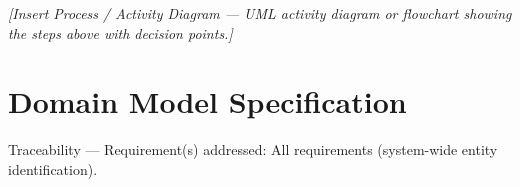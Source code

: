 \documentclass[12pt,a4paper]{article}
\begin{document}
\vspace{0.3cm}
\begin{center}
\textit{[Insert Process / Activity Diagram --- UML activity diagram
or flowchart showing the steps above with decision points.]}
\end{center}
\label{fig:process}

\newpage
\section{Domain Model Specification}

\begin{tracebox}
Traceability --- Requirement(s) addressed: All requirements (system-wide
entity identification).
\end{tracebox}

\vspace{0.3cm}
\end{document}
